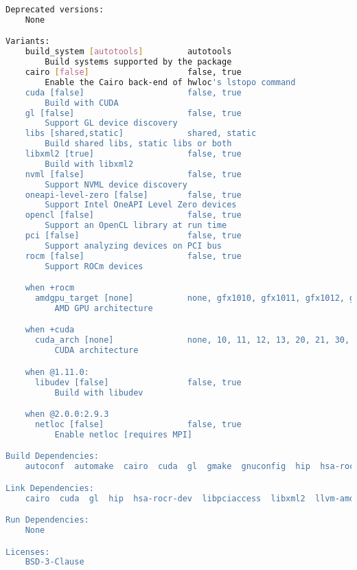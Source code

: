 {\begin{lstlisting}[language=bash]
Deprecated versions:  
    None

Variants:
    build_system [autotools]         autotools
        Build systems supported by the package
    cairo [false]                    false, true
        Enable the Cairo back-end of hwloc's lstopo command
    cuda [false]                     false, true
        Build with CUDA
    gl [false]                       false, true
        Support GL device discovery
    libs [shared,static]             shared, static
        Build shared libs, static libs or both
    libxml2 [true]                   false, true
        Build with libxml2
    nvml [false]                     false, true
        Support NVML device discovery
    oneapi-level-zero [false]        false, true
        Support Intel OneAPI Level Zero devices
    opencl [false]                   false, true
        Support an OpenCL library at run time
    pci [false]                      false, true
        Support analyzing devices on PCI bus
    rocm [false]                     false, true
        Support ROCm devices

    when +rocm
      amdgpu_target [none]           none, gfx1010, gfx1011, gfx1012, gfx1013, gfx1030, gfx1031, gfx1032, gfx1033, gfx1034, gfx1035, gfx1036, gfx1100, gfx1101, gfx1102, gfx1103, gfx701, gfx801, gfx802, gfx803, gfx900, gfx900:xnack-, gfx902, gfx904, gfx906, gfx906:xnack-, gfx908, gfx908:xnack-, gfx909, gfx90a, gfx90a:xnack+, gfx90a:xnack-, gfx90c, gfx940, gfx941, gfx942
          AMD GPU architecture

    when +cuda
      cuda_arch [none]               none, 10, 11, 12, 13, 20, 21, 30, 32, 35, 37, 50, 52, 53, 60, 61, 62, 70, 72, 75, 80, 86, 87, 89, 90, 90a
          CUDA architecture

    when @1.11.0:
      libudev [false]                false, true
          Build with libudev

    when @2.0.0:2.9.3
      netloc [false]                 false, true
          Enable netloc [requires MPI]

Build Dependencies:
    autoconf  automake  cairo  cuda  gl  gmake  gnuconfig  hip  hsa-rocr-dev  libpciaccess  libtool  libxml2  llvm-amdgpu  m4  mpi  ncurses  numactl  oneapi-level-zero  pkgconfig  rocm-opencl  rocm-smi-lib

Link Dependencies:
    cairo  cuda  gl  hip  hsa-rocr-dev  libpciaccess  libxml2  llvm-amdgpu  mpi  ncurses  numactl  oneapi-level-zero  rocm-opencl  rocm-smi-lib

Run Dependencies:
    None

Licenses: 
    BSD-3-Clause
\end{lstlisting}
}
\endinput  %
